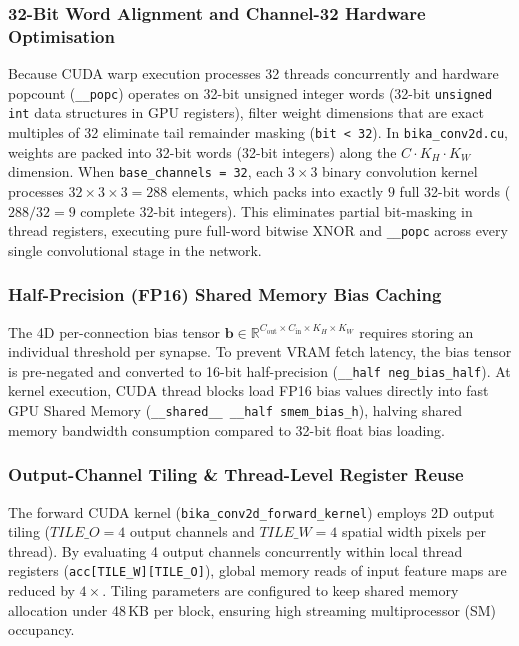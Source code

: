 \documentclass[a4paper]{report}
\begin{document}
\subsubsection{32-Bit Word Alignment and Channel-32 Hardware Optimisation}
Because CUDA warp execution processes 32 threads concurrently and hardware popcount (\texttt{\_\_popc}) operates on 32-bit unsigned integer words (32-bit \texttt{unsigned int} data structures in GPU registers), filter weight dimensions that are exact multiples of 32 eliminate tail remainder masking (\texttt{bit < 32}). In \texttt{bika\_conv2d.cu}, weights are packed into 32-bit words (32-bit integers) along the $C \cdot K_H \cdot K_W$ dimension. When \texttt{base\_channels = 32}, each $3\times3$ binary convolution kernel processes $32 \times 3 \times 3 = 288$ elements, which packs into exactly $9$ full 32-bit words ($288 / 32 = 9$ complete 32-bit integers). This eliminates partial bit-masking in thread registers, executing pure full-word bitwise XNOR and \texttt{\_\_popc} across every single convolutional stage in the network.

\subsubsection{Half-Precision (FP16) Shared Memory Bias Caching}
The 4D per-connection bias tensor $\mathbf{b} \in \mathbb{R}^{C_{\text{out}} \times C_{\text{in}} \times K_H \times K_W}$ requires storing an individual threshold per synapse. To prevent VRAM fetch latency, the bias tensor is pre-negated and converted to 16-bit half-precision (\texttt{\_\_half neg\_bias\_half}). At kernel execution, CUDA thread blocks load FP16 bias values directly into fast GPU Shared Memory (\texttt{\_\_shared\_\_ \_\_half smem\_bias\_h}), halving shared memory bandwidth consumption compared to 32-bit float bias loading.

\subsubsection{Output-Channel Tiling \& Thread-Level Register Reuse}
The forward CUDA kernel (\texttt{bika\_conv2d\_forward\_kernel}) employs 2D output tiling ($TILE\_O = 4$ output channels and $TILE\_W = 4$ spatial width pixels per thread). By evaluating 4 output channels concurrently within local thread registers (\texttt{acc[TILE\_W][TILE\_O]}), global memory reads of input feature maps are reduced by $4\times$. Tiling parameters are configured to keep shared memory allocation under 48\,KB per block, ensuring high streaming multiprocessor (SM) occupancy.
\end{document}
